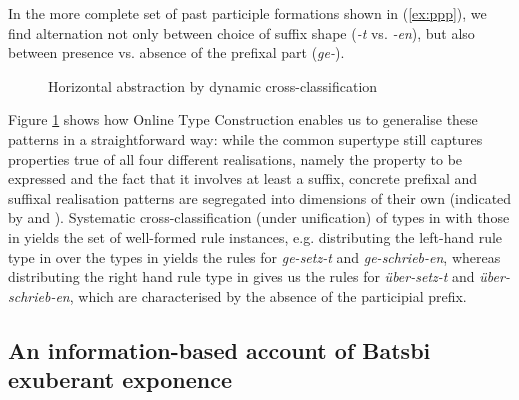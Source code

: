 \documentclass[output=paper]{langsci/langscibook}
\begin{document}
In the more complete set of past participle formations shown in
(\ref{ex:ppp}), we find alternation not only between choice of suffix
shape (\textit{-t} vs. \textit{-en}), but also between presence
vs. absence of the prefixal part (\textit{ge-}).

\begin{figure}

  \caption{Horizontal abstraction by dynamic cross-classification\label{fig:Horizontal}}
\end{figure}

Figure \ref{fig:Horizontal} shows how Online Type Construction enables
us to generalise these patterns in a straightforward way: while the
common supertype still captures properties true of all four different
realisations, namely the property to be expressed and the fact that it
involves at least a suffix, concrete prefixal and suffixal realisation
patterns are segregated into dimensions of their own (indicated by
 and ). Systematic cross-classification
(under unification) of types in  with those in
 yields the set of well-formed rule instances,
e.g. distributing the left-hand rule type in   over the types
in  yields the rules for \textit{ge-setz-t} and
\textit{ge-schrieb-en}, whereas distributing the right hand rule type in
 gives us the rules for \textit{über-setz-t} and
\textit{über-schrieb-en}, which are characterised by the absence of
the participial prefix.

\subsection{An information-based account of Batsbi exuberant exponence }
\label{sec:IbM:Batsbi}
\end{document}
